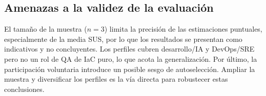 \subsection{Amenazas a la validez de la evaluación}
\label{sec:usab_amenazas}

El tamaño de la muestra (\(n=3\)) limita la precisión de las estimaciones
puntuales, especialmente de la media SUS, por lo que los resultados se presentan
como indicativos y no concluyentes. Los perfiles cubren desarrollo/IA y
DevOps/SRE pero no un rol de \ac{QA} de \ac{IaC} puro, lo que acota la
generalización. Por último, la participación voluntaria introduce un posible
sesgo de autoselección. Ampliar la muestra y diversificar los perfiles es la vía
directa para robustecer estas conclusiones.
